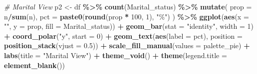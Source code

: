 \documentclass[
]{article}
\newenvironment{Shaded}{\begin{snugshade}}{\end{snugshade}}
\newcommand{\AttributeTok}[1]{\textcolor[rgb]{0.13,0.29,0.53}{#1}}
\newcommand{\CommentTok}[1]{\textcolor[rgb]{0.56,0.35,0.01}{\textit{#1}}}
\newcommand{\DecValTok}[1]{\textcolor[rgb]{0.00,0.00,0.81}{#1}}
\newcommand{\FloatTok}[1]{\textcolor[rgb]{0.00,0.00,0.81}{#1}}
\newcommand{\FunctionTok}[1]{\textcolor[rgb]{0.13,0.29,0.53}{\textbf{#1}}}
\newcommand{\NormalTok}[1]{#1}
\newcommand{\OtherTok}[1]{\textcolor[rgb]{0.56,0.35,0.01}{#1}}
\newcommand{\SpecialCharTok}[1]{\textcolor[rgb]{0.81,0.36,0.00}{\textbf{#1}}}
\newcommand{\StringTok}[1]{\textcolor[rgb]{0.31,0.60,0.02}{#1}}
\begin{document}
\begin{Shaded}
\begin{Highlighting}[]
\CommentTok{\# Marital View}
\NormalTok{p2 }\OtherTok{\textless{}{-}}\NormalTok{ df }\SpecialCharTok{\%\textgreater{}\%}
  \FunctionTok{count}\NormalTok{(Marital\_status) }\SpecialCharTok{\%\textgreater{}\%}
  \FunctionTok{mutate}\NormalTok{(}
    \AttributeTok{prop =}\NormalTok{ n}\SpecialCharTok{/}\FunctionTok{sum}\NormalTok{(n),}
    \AttributeTok{pct =} \FunctionTok{paste0}\NormalTok{(}\FunctionTok{round}\NormalTok{(prop }\SpecialCharTok{*} \DecValTok{100}\NormalTok{, }\DecValTok{1}\NormalTok{), }\StringTok{"\%"}\NormalTok{)}
\NormalTok{  ) }\SpecialCharTok{\%\textgreater{}\%}
  \FunctionTok{ggplot}\NormalTok{(}\FunctionTok{aes}\NormalTok{(}\AttributeTok{x =} \StringTok{""}\NormalTok{, }\AttributeTok{y =}\NormalTok{ prop, }\AttributeTok{fill =}\NormalTok{ Marital\_status)) }\SpecialCharTok{+}
  \FunctionTok{geom\_bar}\NormalTok{(}\AttributeTok{stat =} \StringTok{"identity"}\NormalTok{, }\AttributeTok{width =} \DecValTok{1}\NormalTok{) }\SpecialCharTok{+}
  \FunctionTok{coord\_polar}\NormalTok{(}\StringTok{"y"}\NormalTok{, }\AttributeTok{start =} \DecValTok{0}\NormalTok{) }\SpecialCharTok{+}
  \FunctionTok{geom\_text}\NormalTok{(}\FunctionTok{aes}\NormalTok{(}\AttributeTok{label =}\NormalTok{ pct), }\AttributeTok{position =} \FunctionTok{position\_stack}\NormalTok{(}\AttributeTok{vjust =} \FloatTok{0.5}\NormalTok{)) }\SpecialCharTok{+}
  \FunctionTok{scale\_fill\_manual}\NormalTok{(}\AttributeTok{values =}\NormalTok{ palette\_pie) }\SpecialCharTok{+}
  \FunctionTok{labs}\NormalTok{(}\AttributeTok{title =} \StringTok{"Marital View"}\NormalTok{) }\SpecialCharTok{+}
  \FunctionTok{theme\_void}\NormalTok{() }\SpecialCharTok{+}
  \FunctionTok{theme}\NormalTok{(}\AttributeTok{legend.title =} \FunctionTok{element\_blank}\NormalTok{())}


\end{Highlighting}
\end{Shaded}
\end{document}
